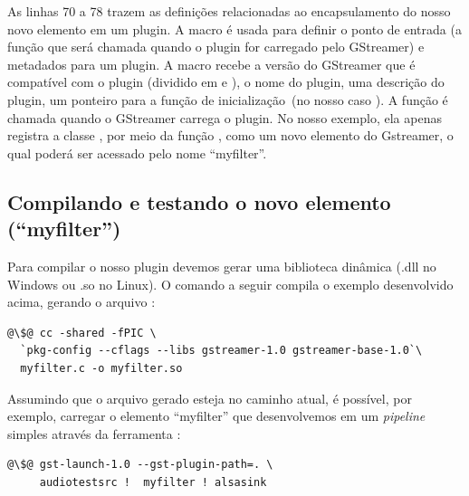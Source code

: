 
As linhas 70 a 78 trazem as definições relacionadas ao encapsulamento do nosso
novo elemento em um plugin.  A macro  é usada para
definir o ponto de entrada (a função que será chamada quando o plugin for
carregado pelo GStreamer) e metadados para um plugin.  A macro recebe a versão
do GStreamer que é compatível com o  plugin (dividido em  e
), o nome do plugin, uma descrição do plugin, um ponteiro para a
função de inicialização~(no nosso caso ).  A função 
 é chamada quando o GStreamer carrega o plugin.  No
nosso exemplo, ela apenas registra a classe , por meio da função
, como um novo elemento do Gstreamer, o qual poderá ser
acessado pelo nome ``myfilter''.



\subsection*{Compilando e testando o novo elemento (``myfilter'')}
Para compilar o nosso plugin devemos gerar uma biblioteca dinâmica (.dll no
Windows ou .so no Linux).  O comando a seguir compila o exemplo desenvolvido
acima, gerando o arquivo :

\begin{lstlisting}[style=command]
@\$@ cc -shared -fPIC \
  `pkg-config --cflags --libs gstreamer-1.0 gstreamer-base-1.0`\
  myfilter.c -o myfilter.so
\end{lstlisting}

Assumindo que o arquivo gerado  esteja no caminho atual, é
possível, por exemplo, carregar o elemento ``myfilter'' que desenvolvemos em um
\emph{pipeline} simples através da ferramenta \C{gst-launch}:

\begin{lstlisting}[style=command]
@\$@ gst-launch-1.0 --gst-plugin-path=. \
     audiotestsrc !  myfilter ! alsasink
\end{lstlisting}

